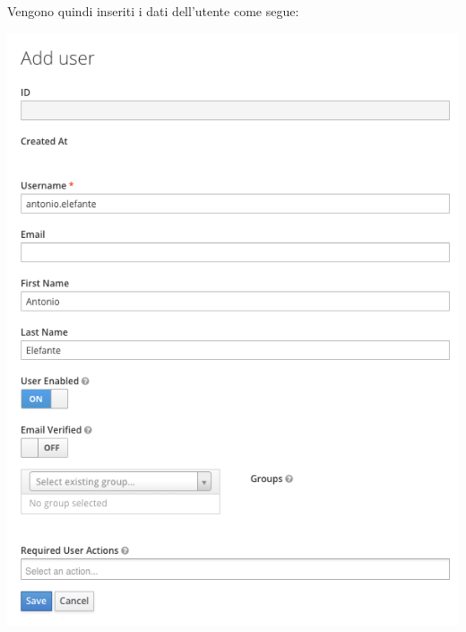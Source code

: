 \documentclass[twoside]{report}
\begin{document}
Vengono quindi inseriti i dati dell'utente come segue:

\begin{center}
\begin{minipage}{0.6\linewidth}
    \vspace{2mm}
    \centering
    \includegraphics[width= \linewidth]{6.png}
    \vspace{2mm}
\end{minipage}
\end{center}
\end{document}
